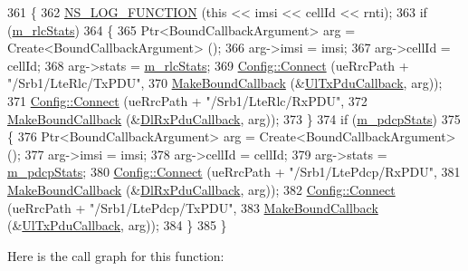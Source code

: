 \begin{DoxyCode}
361 \{
362   \hyperlink{log-macros-disabled_8h_a90b90d5bad1f39cb1b64923ea94c0761}{NS\_LOG\_FUNCTION} (\textcolor{keyword}{this} << imsi << cellId << rnti);
363    \textcolor{keywordflow}{if} (\hyperlink{classns3_1_1RadioBearerStatsConnector_a25b5370b25e598c40f5d40d845ca072b}{m\_rlcStats})
364     \{
365       Ptr<BoundCallbackArgument> arg = Create<BoundCallbackArgument> ();
366       arg->imsi = imsi;
367       arg->cellId = cellId; 
368       arg->stats = \hyperlink{classns3_1_1RadioBearerStatsConnector_a25b5370b25e598c40f5d40d845ca072b}{m\_rlcStats};
369       \hyperlink{group__config_ga4014f151241cd0939b6cb64409605736}{Config::Connect} (ueRrcPath + \textcolor{stringliteral}{"/Srb1/LteRlc/TxPDU"},
370                        \hyperlink{group__makeboundcallback_ga1725d6362e6065faa0709f7c93f8d770}{MakeBoundCallback} (&\hyperlink{namespacens3_ae624428f0992ac62a3c5f2e7318fb98e}{UlTxPduCallback}, arg));
371       \hyperlink{group__config_ga4014f151241cd0939b6cb64409605736}{Config::Connect} (ueRrcPath + \textcolor{stringliteral}{"/Srb1/LteRlc/RxPDU"},
372                        \hyperlink{group__makeboundcallback_ga1725d6362e6065faa0709f7c93f8d770}{MakeBoundCallback} (&\hyperlink{namespacens3_ae4fb5123d8a56fce742428b530ec4197}{DlRxPduCallback}, arg));
373     \}
374   \textcolor{keywordflow}{if} (\hyperlink{classns3_1_1RadioBearerStatsConnector_a984690769317e9eddba15e49170f10d9}{m\_pdcpStats})
375     \{
376       Ptr<BoundCallbackArgument> arg = Create<BoundCallbackArgument> ();
377       arg->imsi = imsi;
378       arg->cellId = cellId; 
379       arg->stats = \hyperlink{classns3_1_1RadioBearerStatsConnector_a984690769317e9eddba15e49170f10d9}{m\_pdcpStats};
380       \hyperlink{group__config_ga4014f151241cd0939b6cb64409605736}{Config::Connect} (ueRrcPath + \textcolor{stringliteral}{"/Srb1/LtePdcp/RxPDU"},
381                        \hyperlink{group__makeboundcallback_ga1725d6362e6065faa0709f7c93f8d770}{MakeBoundCallback} (&\hyperlink{namespacens3_ae4fb5123d8a56fce742428b530ec4197}{DlRxPduCallback}, arg));
382       \hyperlink{group__config_ga4014f151241cd0939b6cb64409605736}{Config::Connect} (ueRrcPath + \textcolor{stringliteral}{"/Srb1/LtePdcp/TxPDU"},
383                        \hyperlink{group__makeboundcallback_ga1725d6362e6065faa0709f7c93f8d770}{MakeBoundCallback} (&\hyperlink{namespacens3_ae624428f0992ac62a3c5f2e7318fb98e}{UlTxPduCallback}, arg));
384     \}
385 \}
\end{DoxyCode}


Here is the call graph for this function\+:




